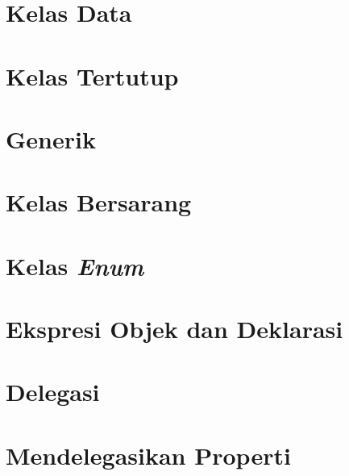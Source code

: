 \section{Kelas Data}

\section{Kelas Tertutup}

\section{Generik}

\section{Kelas Bersarang}

\section{Kelas \textit{Enum}}

\section{Ekspresi Objek dan Deklarasi}

\section{Delegasi}

\section{Mendelegasikan Properti}